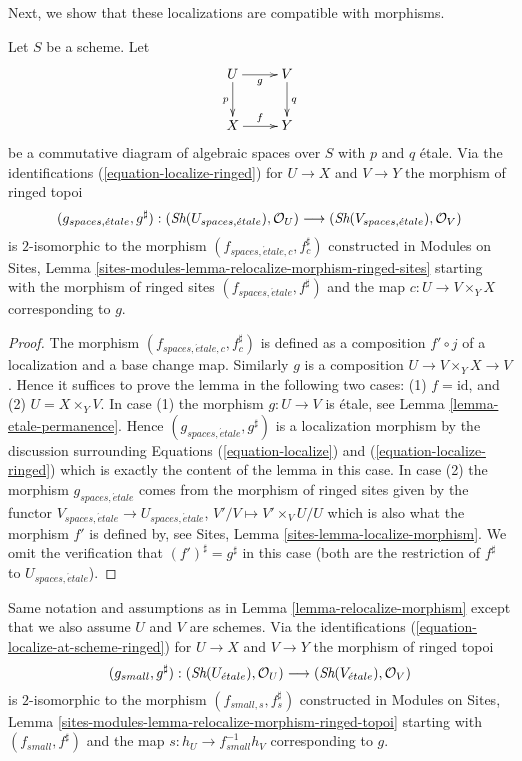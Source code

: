 \medskip\noindent
Next, we show that these localizations are compatible with morphisms.

\begin{lemma}
\label{lemma-relocalize-morphism}
Let $S$ be a scheme. Let
$$
\xymatrix{
U \ar[d]_p \ar[r]_g & V \ar[d]^q \\
X \ar[r]^f & Y
}
$$
be a commutative diagram of algebraic spaces over $S$ with $p$ and $q$ \'etale.
Via the identifications
(\ref{equation-localize-ringed}) for $U \to X$ and $V \to Y$
the morphism of ringed topoi
$$
(g_{spaces, \acute{e}tale}, g^\sharp) :
(\mathop{\textit{Sh}}\nolimits(U_{spaces, \acute{e}tale}), \mathcal{O}_U)
\longrightarrow
(\mathop{\textit{Sh}}\nolimits(V_{spaces, \acute{e}tale}), \mathcal{O}_V)
$$
is $2$-isomorphic to the morphism $(f_{spaces, \acute{e}tale, c}, f_c^\sharp)$
constructed in
Modules on Sites,
Lemma \ref{sites-modules-lemma-relocalize-morphism-ringed-sites}
starting with the morphism of ringed sites
$(f_{spaces, \acute{e}tale}, f^\sharp)$ and
the map $c : U \to V \times_Y X$ corresponding to $g$.
\end{lemma}

\begin{proof}
The morphism $(f_{spaces, \acute{e}tale, c}, f_c^\sharp)$ is defined as a
composition $f' \circ j$
of a localization and a base change map. Similarly $g$ is a composition
$U \to V \times_Y X \to V$. Hence it suffices to prove
the lemma in the following two cases: (1) $f = \text{id}$, and
(2) $U = X \times_Y V$. In case (1) the morphism $g : U \to V$ is
\'etale, see
Lemma \ref{lemma-etale-permanence}.
Hence $(g_{spaces, \acute{e}tale}, g^\sharp)$ is a localization morphism
by the discussion surrounding
Equations (\ref{equation-localize}) and
(\ref{equation-localize-ringed})
which is exactly the content of the lemma in this case.
In case (2) the morphism $g_{spaces, \acute{e}tale}$
comes from the morphism of ringed sites given by the functor
$V_{spaces, \acute{e}tale} \to U_{spaces, \acute{e}tale}$,
$V'/V \mapsto V' \times_V U/U$
which is also what the morphism $f'$ is defined by, see
Sites, Lemma \ref{sites-lemma-localize-morphism}.
We omit the verification that $(f')^\sharp = g^\sharp$
in this case (both are the restriction of $f^\sharp$
to $U_{spaces, \acute{e}tale}$).
\end{proof}

\begin{lemma}
\label{lemma-relocalize-morphism-at-schemes}
Same notation and assumptions as in
Lemma \ref{lemma-relocalize-morphism}
except that we also assume $U$ and $V$ are schemes.
Via the identifications
(\ref{equation-localize-at-scheme-ringed})
for $U \to X$ and $V \to Y$ the morphism of ringed topoi
$$
(g_{small}, g^\sharp) :
(\mathop{\textit{Sh}}\nolimits(U_{\acute{e}tale}), \mathcal{O}_U)
\longrightarrow
(\mathop{\textit{Sh}}\nolimits(V_{\acute{e}tale}), \mathcal{O}_V)
$$
is $2$-isomorphic to the morphism $(f_{small, s}, f_s^\sharp)$
constructed in
Modules on Sites,
Lemma \ref{sites-modules-lemma-relocalize-morphism-ringed-topoi}
starting with $(f_{small}, f^\sharp)$ and
the map $s : h_U \to f_{small}^{-1}h_V$ corresponding to $g$.
\end{lemma}

